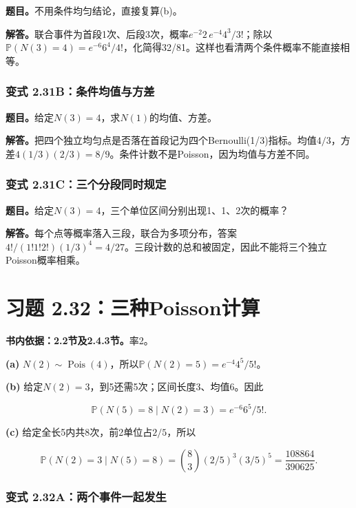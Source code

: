 \documentclass[12pt,a4paper,UTF8,fontset=fandol]{ctexart}
\begin{document}
\textbf{题目。}不用条件均匀结论，直接复算(b)。

\textbf{解答。}联合事件为首段1次、后段3次，概率\(e^{-2}2\,e^{-4}4^3/3!\)；除以\(\mathbb P(N(3)=4)=e^{-6}6^4/4!\)，化简得32/81。这样也看清两个条件概率不能直接相等。

\subsubsection{变式
2.31B：条件均值与方差}\label{ux53d8ux5f0f-2.31bux6761ux4ef6ux5747ux503cux4e0eux65b9ux5dee}

\textbf{题目。}给定\(N(3)=4\)，求\(N(1)\)的均值、方差。

\textbf{解答。}把四个独立均匀点是否落在首段记为四个Bernoulli(1/3)指标。均值\(4/3\)，方差\(4(1/3)(2/3)=8/9\)。条件计数不是Poisson，因为均值与方差不同。

\subsubsection{变式
2.31C：三个分段同时规定}\label{ux53d8ux5f0f-2.31cux4e09ux4e2aux5206ux6bb5ux540cux65f6ux89c4ux5b9a}

\textbf{题目。}给定\(N(3)=4\)，三个单位区间分别出现1、1、2次的概率？

\textbf{解答。}每个点等概率落入三段，联合为多项分布，答案\(4!/(1!1!2!)(1/3)^4=4/27\)。三段计数的总和被固定，因此不能将三个独立Poisson概率相乘。

\section{习题
2.32：三种Poisson计算}\label{ux4e60ux9898-2.32ux4e09ux79cdpoissonux8ba1ux7b97}

\textbf{书内依据：2.2节及2.4.3节。}率2。

\textbf{(a)}
\(N(2)\sim\operatorname{Pois}(4)\)，所以\(\boxed{\mathbb P(N(2)=5)=e^{-4}4^5/5!}\)。

\textbf{(b)} 给定\(N(2)=3\)，到5还需5次；区间长度3、均值6。因此

\[\boxed{\mathbb P(N(5)=8\mid N(2)=3)=e^{-6}6^5/5!}.\]

\textbf{(c)} 给定全长5内共8次，前2单位占\(2/5\)，所以

\[\boxed{\mathbb P(N(2)=3\mid N(5)=8)
=\binom83(2/5)^3(3/5)^5=\frac{108864}{390625}.}\]

\subsubsection{变式
2.32A：两个事件一起发生}\label{ux53d8ux5f0f-2.32aux4e24ux4e2aux4e8bux4ef6ux4e00ux8d77ux53d1ux751f}
\end{document}
